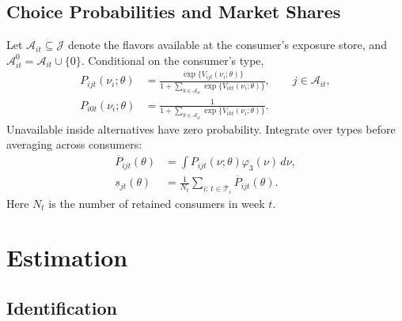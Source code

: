 \documentclass[12pt]{article}
\theoremstyle{definition}
\theoremstyle{remark}
\begin{document}
\subsection{Choice Probabilities and Market Shares}
Let $\mathcal A_{it}\subseteq\mathcal J$ denote the flavors available at the
consumer's exposure store, and $\mathcal A_{it}^0=\mathcal A_{it}\cup\{0\}$.
Conditional on the consumer's type,
\begin{align}
 P_{ijt}(\nu_i;\theta)
 &=\frac{\exp\{V_{ijt}(\nu_i;\theta)\}}
 {1+\sum_{k\in\mathcal A_{it}}\exp\{V_{ikt}(\nu_i;\theta)\}},
 \qquad j\in\mathcal A_{it},
 \label{eq:choice-probability}\\
 P_{i0t}(\nu_i;\theta)
 &=\frac{1}{1+\sum_{k\in\mathcal A_{it}}\exp\{V_{ikt}(\nu_i;\theta)\}}.
\end{align}
Unavailable inside alternatives have zero probability.
Integrate over types before averaging across consumers:
\begin{align}
 \overline P_{ijt}(\theta)
 &=\int P_{ijt}(\nu;\theta)\varphi_3(\nu)\,d\nu,\\
 s_{jt}(\theta)&=\frac{1}{N_t}\sum_{i:\,t\in\mathcal T_i}\overline P_{ijt}(\theta).
\end{align}
Here $N_t$ is the number of retained consumers in week $t$.

\section{Estimation}
\label{sec:estimation}

\subsection{Identification}
\label{subsec:identification}
\end{document}
